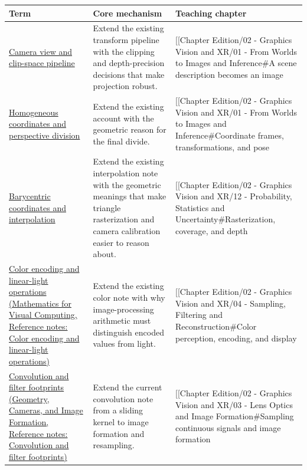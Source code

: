 {\def\LTcaptype{none} %
\begin{longtable}[]{@{}
  >{\raggedright\arraybackslash}p{}
  >{\raggedright\arraybackslash}p{}
  >{\raggedright\arraybackslash}p{}@{}}
\toprule\noalign{}
\begin{minipage}[b]{\linewidth}\raggedright
Term
\end{minipage} & \begin{minipage}[b]{\linewidth}\raggedright
Core mechanism
\end{minipage} & \begin{minipage}[b]{\linewidth}\raggedright
Teaching chapter
\end{minipage} \\
\midrule\noalign{}
\endhead
\bottomrule\noalign{}
\endlastfoot
\hyperref[appendix-1c07d64f5e70]{Camera view and clip-space pipeline} & Extend the existing transform pipeline with the clipping and depth-precision decisions that make projection robust. & {[}{[}Chapter Edition/02 - Graphics Vision and XR/01 - From Worlds to Images and Inference\#A scene description becomes an image \\
\hyperref[appendix-cb3b26862282]{Homogeneous coordinates and perspective division} & Extend the existing account with the geometric reason for the final divide. & {[}{[}Chapter Edition/02 - Graphics Vision and XR/01 - From Worlds to Images and Inference\#Coordinate frames, transformations, and pose \\
\hyperref[appendix-02b9d9a81dca]{Barycentric coordinates and interpolation} & Extend the existing interpolation note with the geometric meanings that make triangle rasterization and camera calibration easier to reason about. & {[}{[}Chapter Edition/02 - Graphics Vision and XR/12 - Probability, Statistics and Uncertainty\#Rasterization, coverage, and depth \\
\href{../02-Mathematics-for-Visual-Computing/main.pdf\#nameddest=appendix-a9f83ad40792}{Color encoding and linear-light operations (Mathematics for Visual Computing, Reference notes: Color encoding and linear-light operations)} & Extend the existing color note with why image-processing arithmetic must distinguish encoded values from light. & {[}{[}Chapter Edition/02 - Graphics Vision and XR/04 - Sampling, Filtering and Reconstruction\#Color perception, encoding, and display \\
\href{../03-Geometry-Cameras-and-Image-Formation/main.pdf\#nameddest=appendix-d5b3c692d9f0}{Convolution and filter footprints (Geometry, Cameras, and Image Formation, Reference notes: Convolution and filter footprints)} & Extend the current convolution note from a sliding kernel to image formation and resampling. & {[}{[}Chapter Edition/02 - Graphics Vision and XR/03 - Lens Optics and Image Formation\#Sampling continuous signals and image formation \\

\end{longtable}}
